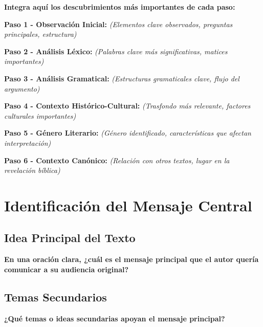 \documentclass[11pt,a4paper]{article}
\begin{document}
\begin{synthesisbox}
\textbf{Integra aquí los descubrimientos más importantes de cada paso:}
\end{synthesisbox}

\textbf{Paso 1 - Observación Inicial:}
\textit{(Elementos clave observados, preguntas principales, estructura)}
\vspace{2cm}

\textbf{Paso 2 - Análisis Léxico:}
\textit{(Palabras clave más significativas, matices importantes)}
\vspace{2cm}

\textbf{Paso 3 - Análisis Gramatical:}
\textit{(Estructuras gramaticales clave, flujo del argumento)}
\vspace{2cm}

\textbf{Paso 4 - Contexto Histórico-Cultural:}
\textit{(Trasfondo más relevante, factores culturales importantes)}
\vspace{2cm}

\textbf{Paso 5 - Género Literario:}
\textit{(Género identificado, características que afectan interpretación)}
\vspace{2cm}

\textbf{Paso 6 - Contexto Canónico:}
\textit{(Relación con otros textos, lugar en la revelación bíblica)}
\vspace{2cm}

\newpage

\section{Identificación del Mensaje Central}

\subsection{Idea Principal del Texto}

\begin{interpretationbox}
\textbf{En una oración clara, ¿cuál es el mensaje principal que el autor quería comunicar a su audiencia original?}
\end{interpretationbox}

\vspace{4cm}

\subsection{Temas Secundarios}

\textbf{¿Qué temas o ideas secundarias apoyan el mensaje principal?}
\end{document}
